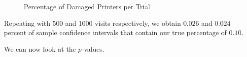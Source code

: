 \documentclass[10pt]{report}\usepackage[]{graphicx}\usepackage[]{xcolor}
\newenvironment{knitrout}{}{} %
\begin{document}
\begin{easylist}[enumerate]
\begin{knitrout}
\begin{figure}[H]
{{}

}
\caption[Percentage of Damaged Printers per Trial]{Percentage of Damaged Printers per Trial\label{fig:multivisits_new} }
\end{figure}


\end{knitrout}


        Repeating with 500 and 1000 visits respectively, we obtain $0.026$ and
        $0.024$ percent of sample confidence intervals that contain our true percentage of
        $0.10$.\newline

        We can now look at the $p$-values.


\end{easylist}
\end{document}

